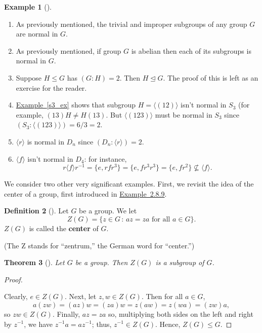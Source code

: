 \documentclass[10pt,openany,oneside]{book}
\newcommand{\terminology}[1]{\textbf{#1}}
\theoremstyle{plain}
\newtheorem{theorem}{Theorem}[section]
\theoremstyle{definition}
\newtheorem{definition}[theorem]{Definition}
\theoremstyle{definition}
\theoremstyle{definition}
\newtheorem{example}[theorem]{Example}
\theoremstyle{definition}
\numberwithin{equation}{section}
\begin{document}
\begin{example}[]\label{example-77}
\leavevmode%
\begin{enumerate}
\item\hypertarget{li-488}{}As previously mentioned, the trivial and improper subgroups of any group \(G\) are normal in \(G\).%
\item\hypertarget{li-489}{}As previously mentioned, if group \(G\) is abelian then each of its subgroups is normal in \(G\).%
\item\hypertarget{li-490}{}Suppose \(H\leq G\) has \((G:H)=2\).  Then \(H \unlhd G\). The proof of this is left as an exercise for the reader.%
\item\hypertarget{li-491}{}\hyperref[s3_ex]{Example~\ref{s3_ex}} shows that subgroup \(H=\langle (12)\rangle\) isn't normal in \(S_3\) (for example, \((13)H\neq H(13)\).  But \(\langle (123)\rangle\) must be normal in \(S_3\) since \((S_3:\langle (123)\rangle )=6/3=2.\)%
\item\hypertarget{li-492}{}\(\langle r\rangle\) is normal in \(D_n\) since \((D_n:\langle r\rangle )=2\).%
\item\hypertarget{li-493}{}\(\langle f\rangle\) isn't normal in \(D_4\): for instance,%
\begin{equation*}
r\langle f\rangle r^{-1}=\{e,rfr^3\}=\{e, fr^3r^3\}=\{e,fr^2\}\not\subseteq
\langle f\rangle .
\end{equation*}
%
\end{enumerate}
%
\end{example}
We consider two other very significant examples. First, we revisit the idea of the center of a group, first introduced in \hyperlink{zgdef}{Example~2.8.9}.%
\begin{definition}[{}]\label{definition-66}
Let \(G\) be a group. We let%
\begin{equation*}
Z(G)=\{z\in G\,:\, az=za \text{ for all } a\in
G\}.
\end{equation*}
\(Z(G)\) is called the \terminology{center} of \(G\).%
\par
(The Z stands for ``zentrum,'' the German word for ``center.'')%
\end{definition}
\begin{theorem}[{}]\label{theorem-52}
Let \(G\) be a group. Then \(Z(G)\) is a subgroup of \(G\).%
\end{theorem}
\begin{proof}\hypertarget{proof-41}{}
Clearly, \(e\in Z(G)\). Next, let \(z,w\in Z(G)\). Then for all \(a \in G\),%
\begin{equation*}
a(zw)=(az)w=(za)w=z(aw)=z(wa)=(zw)a,
\end{equation*}
so \(zw\in Z(G)\). Finally, \(az=za\) so, multiplying both sides on the left and right by \(z^{-1}\), we have \(z^{-1}a=az^{-1}\); thus, \(z^{-1}\in Z(G)\). Hence, \(Z(G)\leq G\).%
\end{proof}
\end{document}
